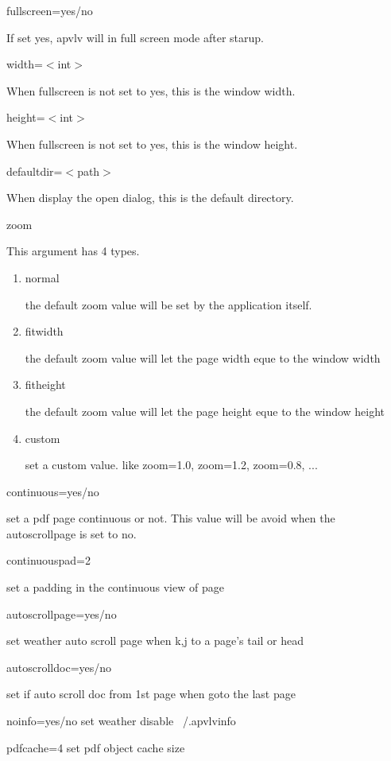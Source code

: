 \documentclass[a4paper,12pt]{article}
\begin{document}
\begin{description}

\item fullscreen=yes/no

If set yes, apvlv will in full screen mode after starup.

\item width=$<$int$>$

When fullscreen is not set to yes, this is the window width.

\item height=$<$int$>$

When fullscreen is not set to yes, this is the window height.

\item defaultdir=$<$path$>$

When display the open dialog, this is the default directory.

\item zoom

This argument has 4 types.

\begin{enumerate}

\item normal

the default zoom value will be set by the application itself.

\item fitwidth

the default zoom value will let the page width eque to the window width

\item fitheight

the default zoom value will let the page height eque to the window height

\item custom

set a custom value. like zoom=1.0, zoom=1.2, zoom=0.8, ...

\end{enumerate}

\item continuous=yes/no

set a pdf page continuous or not. This value will be avoid when the autoscrollpage is set to no.

\item continuouspad=2

set a padding in the continuous view of page

\item autoscrollpage=yes/no

set weather auto scroll page when k,j to a page's tail or head

\item autoscrolldoc=yes/no

set if auto scroll doc from 1st page when goto the last page

\item noinfo=yes/no
set weather disable ~/.apvlvinfo

\item pdfcache=4
set pdf object cache size

\end{description}
\end{document}

